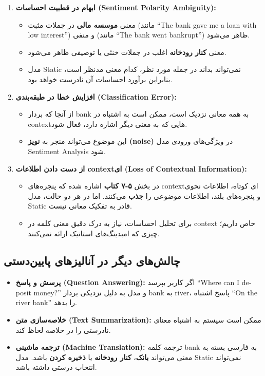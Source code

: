 \documentclass[11pt,a4paper]{article}
\newcommand{\en}[1]{\textenglish{#1}}
\begin{document}
\begin{enumerate}
    \item \textbf{ابهام در قطبیت احساسات (\en{Sentiment Polarity Ambiguity}):}
    \begin{itemize}
        \item معنی \textbf{موسسه مالی} در جملات مثبت (مانند \en{``The bank gave me a loan with low interest''}) و منفی (مانند \en{``The bank went bankrupt''}) ظاهر می‌شود.
        \item معنی \textbf{کنار رودخانه} اغلب در جملات خنثی یا توصیفی ظاهر می‌شود.
        \item مدل \en{Static} نمی‌تواند بداند در جمله مورد نظر، کدام معنی مدنظر است، بنابراین برآورد احساسات آن نادرست خواهد بود.
    \end{itemize}
    
    \item \textbf{افزایش خطا در طبقه‌بندی (\en{Classification Error}):}
    \begin{itemize}
        \item از آنجا که بردار \en{bank} به همه معانی نزدیک است، ممکن است به اشتباه در \en{context}‌هایی که به معنی دیگر اشاره دارد، فعال شود.
        \item این موضوع می‌تواند منجر به \textbf{نویز (\en{noise})} در ویژگی‌های ورودی مدل \en{Sentiment Analysis} شود.
    \end{itemize}
    
    \item \textbf{از دست دادن اطلاعات \en{context}ای (\en{Loss of Contextual Information}):}
    \begin{itemize}
        \item در بخش \textbf{\en{۵-۷} کتاب} اشاره شده که پنجره‌های \en{context}ای کوتاه، اطلاعات نحوی و پنجره‌های بلند، اطلاعات موضوعی را \textbf{جذب} می‌کنند. اما در هر دو حالت، مدل \en{Static} قادر به تفکیک معانی نیست.
        \item برای تحلیل احساسات، نیاز به درک دقیق معنی کلمه در \en{context} خاص داریم؛ چیزی که امبدینگ‌های استاتیک ارائه نمی‌کنند.
    \end{itemize}
\end{enumerate}

\subsection{چالش‌های دیگر در آنالیزهای پایین‌دستی}
\begin{itemize}
    \item \textbf{پرسش و پاسخ (\en{Question Answering}):} اگر کاربر بپرسد \en{``Where can I deposit money?''} و مدل به دلیل نزدیکی بردار \en{bank} به \en{river}، پاسخ اشتباه \en{``On the river bank''} را بدهد.
    \item \textbf{خلاصه‌سازی متن (\en{Text Summarization}):} ممکن است سیستم به اشتباه معنای نادرستی را در خلاصه لحاظ کند.
    \item \textbf{ترجمه ماشینی (\en{Machine Translation}):} ترجمه کلمه \en{bank} به فارسی بسته به معنی می‌تواند \textbf{بانک}، \textbf{کنار رودخانه} یا \textbf{ذخیره کردن} باشد. مدل \en{Static} نمی‌تواند انتخاب درستی داشته باشد.
\end{itemize}
\end{document}
